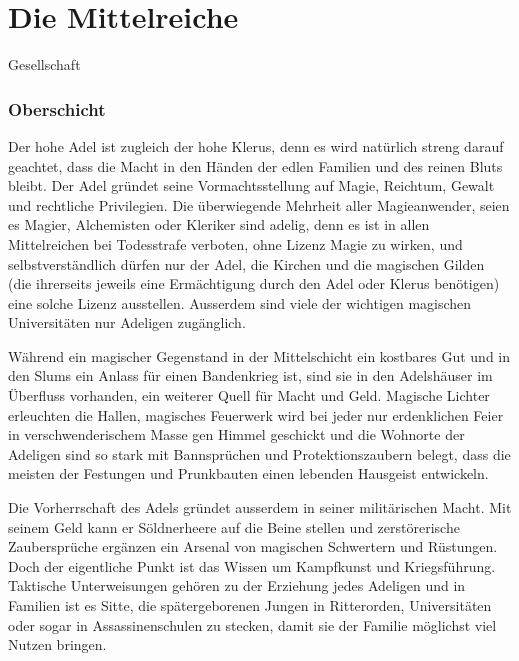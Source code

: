 \documentclass[10pt,twoside,twocolumn,openany]{book}
\newenvironment{mcolsec*}[1]{\section{#1}\begin{multicols}{2}}{
\end{multicols}}
\begin{document}
\chapter{Die Mittelreiche}

\begin{mcolsec*}{Gesellschaft}

\subsection{Oberschicht}
Der hohe Adel ist zugleich der hohe Klerus, denn es wird natürlich streng darauf geachtet, dass die Macht in den Händen der edlen Familien und des reinen Bluts bleibt. Der Adel gründet seine Vormachtsstellung auf Magie, Reichtum, Gewalt und rechtliche Privilegien. Die überwiegende Mehrheit aller Magieanwender, seien es Magier, Alchemisten oder Kleriker sind adelig, denn es ist in allen Mittelreichen bei Todesstrafe verboten, ohne Lizenz Magie zu wirken, und selbstverständlich dürfen nur der Adel, die Kirchen und die magischen Gilden (die ihrerseits jeweils eine Ermächtigung durch den Adel oder Klerus benötigen) eine solche Lizenz ausstellen. Ausserdem sind viele der wichtigen magischen Universitäten nur Adeligen zugänglich.
	
	Während ein magischer Gegenstand in der Mittelschicht ein kostbares Gut und in den Slums ein Anlass für einen Bandenkrieg ist, sind sie in den Adelshäuser im Überfluss vorhanden, ein weiterer Quell für Macht und Geld.
	Magische Lichter erleuchten die Hallen, magisches Feuerwerk wird bei jeder nur erdenklichen Feier in verschwenderischem Masse gen Himmel geschickt und die Wohnorte der Adeligen sind so stark mit Bannsprüchen und Protektionszaubern belegt, dass die meisten der Festungen und Prunkbauten einen lebenden Hausgeist entwickeln.
	
	Die Vorherrschaft des Adels gründet ausserdem in seiner militärischen Macht. Mit seinem Geld kann er Söldnerheere auf die Beine stellen und zerstörerische Zaubersprüche ergänzen ein Arsenal von magischen Schwertern und Rüstungen. Doch der eigentliche Punkt ist das Wissen um Kampfkunst und Kriegsführung. Taktische Unterweisungen gehören zu der Erziehung jedes Adeligen und in Familien ist es Sitte, die spätergeborenen Jungen in Ritterorden, Universitäten oder sogar in Assassinenschulen zu stecken, damit sie der Familie möglichst viel Nutzen bringen.
	

\end{mcolsec*}
\end{document}
